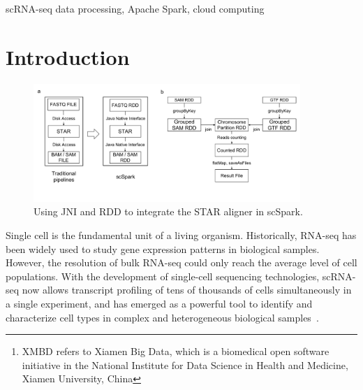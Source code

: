 \documentclass[conference]{IEEEtran}
\begin{document}
\begin{abstract}
High-throughput single-cell RNA sequencing (scRNA-seq) data processing pipelines integrate multiple modules to transform raw scRNA-seq data to gene expression matrices, including barcode processing, sequence quality control, genome alignment and transcript quantification.
With the rapid growth in data volume, the speed of scRNA-seq data processing pipeline has become a major bottleneck to large-scale scRNA-seq studies. 
We present scSpark$^\textrm{XMBD}$\footnote{XMBD refers to Xiamen Big Data, which is a biomedical open software initiative in the National Institute for Data Science in Health and Medicine, Xiamen University, China} (denoted as scSpark), a cloud computing based scRNA-seq data processing pipeline. 
By leveraging the in-memory computing capability of Apache Spark, scSpark significantly improves the processing speed of scRNA-seq data, and achieves around 5-20 times faster than the state-of-the-art processing pipelines under the same CPU core consumption.
In addition, thanks to the inherent scalability of Spark in a cloud computing environment, scSpark can further reduce the processing time for a typical scRNA-seq dataset (e.g., 640 million reads) from hours to minutes when multiple computer nodes (e.g., 16) are used.  
Biological evaluation also confirmed that the results generated by scSpark are highly consistent with existing scRNA-seq data processing pipelines.
\end{abstract}

\begin{IEEEkeywords}
scRNA-seq data processing, Apache Spark, cloud computing
\end{IEEEkeywords}

\section{Introduction}
\begin{figure}
	\centering
	\includegraphics[width=0.9\textwidth]{fig1.pdf}
	\caption{Using JNI and RDD to integrate the STAR aligner in scSpark.} \label{fig1}
\end{figure}
Single cell is the fundamental unit of a living organism.
Historically, RNA-seq has been widely used to study gene expression patterns in biological samples.
However, the resolution of bulk RNA-seq could only reach the average level of cell populations. 
With the development of single-cell sequencing technologies, scRNA-seq now allows transcript profiling of tens of thousands of cells simultaneously in a single experiment, and has emerged as a powerful tool to identify and characterize cell types in complex and heterogeneous biological samples~\cite{Zhang2019ComparativeAO}.
\end{document}
